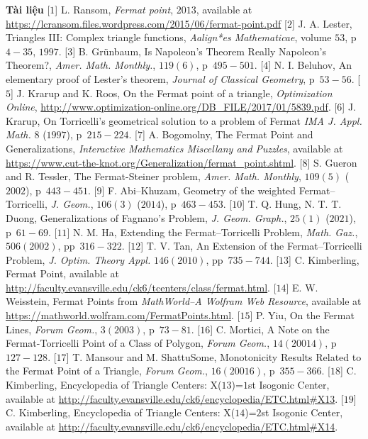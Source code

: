 \begin{multicols}{2}
	\vskip 0.1cm
	\textbf{\color{cackithi}Tài liệu}
	\vskip 0.1cm
	[$1$] L. Ransom, {\it Fermat point}, $2013$, available at \url{https://lcransom.files.wordpress.com/2015/06/fermat-point.pdf}
	\vskip 0.1cm
	[$2$] J. A. Lester, Triangles III: Complex triangle functions, {\it Aalign*es Mathematicae}, volume $53$, p~$4-35$, $1997$.
	\vskip 0.1cm
	[$3$] B. Grünbaum, Is Napoleon’s Theorem Really Napoleon’s Theorem?, {\it Amer. Math. Monthly.}, $119(6)$,
		p~$495-501$.
	\vskip 0.1cm
	[$4$] N. I. Beluhov, An elementary proof of Lester’s theorem, {\it Journal of Classical Geometry}, p~$53-56$.
	\vskip 0.1cm
	[$5$] J. Krarup and K. Roos, On the Fermat point
	of a triangle, {\it Optimization Online}, \url{http://www.optimization-online.org/DB_FILE/2017/01/5839.pdf}.
	\vskip 0.1cm	
	[$6$] J. Krarup, On Torricelli's geometrical solution to a problem of Fermat {\it IMA J. Appl. Math.} {$8$} ($1997$), p~$215-224$.
	\vskip 0.1cm	
	[$7$] A. Bogomolny, The Fermat Point and Generalizations, {\it Interactive Mathematics Miscellany and Puzzles}, available at \url{ https://www.cut-the-knot.org/Generalization/fermat_point.shtml}.
	\vskip 0.1cm	
	[$8$] S. Gueron and R. Tessler, The Fermat-Steiner
	problem, {\it Amer. Math. Monthly}, $109(5)$ ($2002$), p~$443-451$.
	\vskip 0.1cm
	[$9$] F. Abi--Khuzam, Geometry of the weighted Fermat--Torricelli, {\it J. Geom.}, $106(3)$ ($2014$), p~$463-453$.
	\vskip 0.1cm
	[$10$] T. Q. Hung, N. T. T. Duong, 	Generalizations of Fagnano's Problem, {\it J. Geom. Graph.}, $25(1)$ ($2021$), p~$61-69$.
	\vskip 0.1cm
	[$11$] N. M. Ha, Extending the Fermat--Torricelli Problem, {\it Math. Gaz.}, $506(2002)$, pp~$316-322$.
	\vskip 0.1cm
	[$12$] T. V. Tan, An Extension of the Fermat--Torricelli Problem, {\it J. Optim. Theory Appl.} $146(2010)$, pp~$735-744$.
	\vskip 0.1cm
	[$13$] C. Kimberling, Fermat Point, available at \url{ http://faculty.evansville.edu/ck6/tcenters/class/fermat.html}.
	\vskip 0.1cm
	[$14$] E. W. Weisstein, Fermat Points from {\it MathWorld--A Wolfram Web Resource}, available at \url{https://mathworld.wolfram.com/FermatPoints.html}.
	\vskip 0.1cm
	[$15$] P. Yiu, On the Fermat Lines, {\it Forum Geom.}, $3(2003)$, p~$73-81$.
	\vskip 0.1cm
	[$16$] C. Mortici, A Note on the Fermat-Torricelli Point of a Class of Polygon, {\it Forum Geom.}, $14(20014)$, p~$127-128$.
	\vskip 0.1cm
	[$17$] T. Mansour and M. ShattuSome, Monotonicity Results Related to the Fermat Point of a Triangle, {\it Forum Geom.}, $16(20016)$, p~$355-366$.
	\vskip 0.1cm
	[$18$] C. Kimberling, Encyclopedia of Triangle Centers: X($13$)=$1$st Isogonic Center, available at \url{  http://faculty.evansville.edu/ck6/encyclopedia/ETC.html#X13}.
	\vskip 0.1cm
	[$19$] C. Kimberling, Encyclopedia of Triangle Centers: X($14$)=$2$st Isogonic Center, available at \url{  http://faculty.evansville.edu/ck6/encyclopedia/ETC.html#X14}.
\end{multicols}
